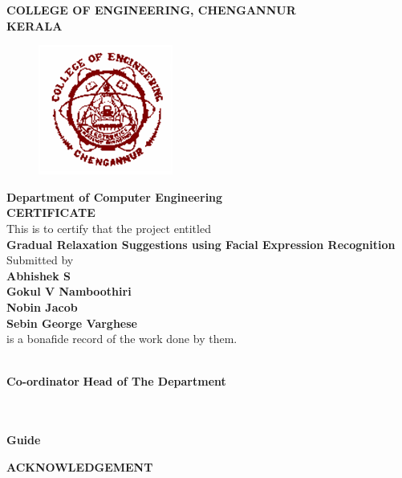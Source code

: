 \documentclass[a4paper,12pt,oneside]{article}
\begin{document}
\newpage
\thispagestyle{empty}
\begin{center}
\setlength{\baselineskip}{1.5\baselineskip}
{\large\textbf{COLLEGE OF ENGINEERING, CHENGANNUR}}
\\
{\large\textbf{KERALA}}
\vspace{4mm}
\begin{figure}[H]
\centering
\includegraphics{ceclogo.png}
\end{figure}
\setlength{\baselineskip}{1.5\baselineskip}
\textbf{Department of Computer Engineering}
\\
\textbf{CERTIFICATE}
\\
This is to certify that the project entitled
\\
\textbf{Gradual Relaxation Suggestions using Facial Expression Recognition}
\\
Submitted by
\\
\textbf{Abhishek S}
\\
\textbf{Gokul V Namboothiri}
\\
\textbf{Nobin Jacob}
\\
\textbf{Sebin George Varghese}
\\
is a bonafide record of the work done by them.
\end{center}
\vspace{2ex}
\vspace{10ex}
\hspace{55ex}
\\
\vspace{2ex}
\hspace{5ex}
\textbf{
Co-ordinator}
\hspace{40ex}
\textbf{
Head of The Department}
\\
\\
\\
\begin{center}
\textbf{
Guide}
\end{center}

\newpage
{}
\renewcommand{\headrulewidth}{0.0pt}
\renewcommand{\footrulewidth}{0.0pt}
\begin{center}
\large{\textbf{ACKNOWLEDGEMENT}}
\end{center}
\vspace{4ex}
\setlength{\baselineskip}{1.5\baselineskip}
\end{document}
